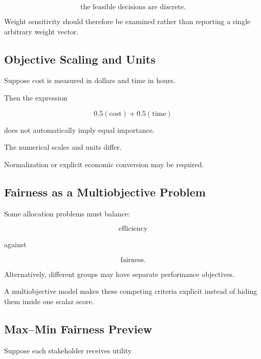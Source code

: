 \[
\boxed{
\text{the feasible decisions are discrete}.
}
\]

Weight sensitivity should therefore be examined rather than reporting a
single arbitrary weight vector.

\subsection{Objective Scaling and Units}
\label{subsec:objective-scaling-units}

Suppose cost is measured in dollars and time in hours.

Then the expression

\[
\boxed{
0.5
(\text{cost})
+
0.5
(\text{time})
}
\]

does not automatically imply equal importance.

The numerical scales and units differ.

Normalization or explicit economic conversion may be required.

\subsection{Fairness as a Multiobjective Problem}
\label{subsec:fairness-multiobjective}

Some allocation problems must balance:

\[
\boxed{
\text{efficiency}
}
\]

against

\[
\boxed{
\text{fairness}.
}
\]

Alternatively, different groups may have separate performance objectives.

A multiobjective model makes these competing criteria explicit instead of
hiding them inside one scalar score.

\subsection{Max--Min Fairness Preview}
\label{subsec:max-min-fairness}

Suppose each stakeholder receives utility

